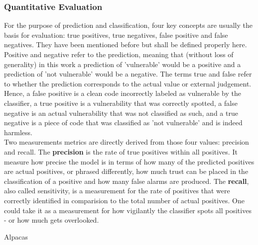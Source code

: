 \documentclass[
	a4paper,
	pagesize,
	pdftex,
	12pt,
	twoside, %
	BCOR=5mm, %
	ngerman,
	fleqn,
	final,
	]{scrartcl}
\begin{document}
\subsubsection{Quantitative Evaluation}\label{quantitative}
For the purpose of prediction and classification, four key concepts are usually the basis for evaluation: true positives, true negatives, false positive and false negatives. They have been mentioned before but shall be defined properly here. Positive and negative refer to the prediction, meaning that (without loss of generality) in this work a prediction of 'vulnerable' would be a positive and a prediction of 'not vulnerable' would be a negative. The terms true and false refer to whether the prediction corresponds to the actual value or external judgement. Hence, a false positive is a clean code incorrectly labeled as vulnerable by the classifier, a true positive is a vulnerability that was correctly spotted, a false negative is an actual vulnerability that was not classified as such, and a true negative is a piece of code that was classified as 'not vulnerable' and is indeed harmless.\\
Two measurements metrics are directly derived from those four values: precision and recall. The \textbf{precision} is the rate of true positives within all positives. It measure how precise the model is in terms of how many of the predicted positives are actual positives, or phrased differently, how much trust can be placed in the classification of a positive and how many false alarms are produced. The \textbf{recall}, also called sensitivity, is a measurement for the rate of positives that were correctly identified in comparision to the total number of actual positives. One could take it as a measurement for how vigilantly the classifier spots all positives - or how much gets overlooked.\newline

Alpacas ~\cite{SanMartin.1968}
\end{document}
